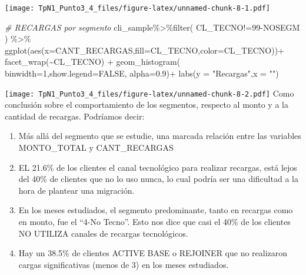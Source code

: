 \documentclass[
]{article}
\newenvironment{Shaded}{\begin{snugshade}}{\end{snugshade}}
\newcommand{\AttributeTok}[1]{\textcolor[rgb]{0.77,0.63,0.00}{#1}}
\newcommand{\CommentTok}[1]{\textcolor[rgb]{0.56,0.35,0.01}{\textit{#1}}}
\newcommand{\ConstantTok}[1]{\textcolor[rgb]{0.00,0.00,0.00}{#1}}
\newcommand{\DecValTok}[1]{\textcolor[rgb]{0.00,0.00,0.81}{#1}}
\newcommand{\FloatTok}[1]{\textcolor[rgb]{0.00,0.00,0.81}{#1}}
\newcommand{\FunctionTok}[1]{\textcolor[rgb]{0.00,0.00,0.00}{#1}}
\newcommand{\NormalTok}[1]{#1}
\newcommand{\SpecialCharTok}[1]{\textcolor[rgb]{0.00,0.00,0.00}{#1}}
\newcommand{\StringTok}[1]{\textcolor[rgb]{0.31,0.60,0.02}{#1}}
\begin{document}
\texttt{[image: TpN1\_Punto3\_4\_files/figure-latex/unnamed-chunk-8-1.pdf]}

\begin{Shaded}
\begin{Highlighting}[]
\CommentTok{\# RECARGAS por segmento}
\NormalTok{cli\_sample}\SpecialCharTok{\%\textgreater{}\%}\FunctionTok{filter}\NormalTok{( CL\_TECNO}\SpecialCharTok{!=}\StringTok{\textquotesingle{}99{-}NOSEGM\textquotesingle{}}\NormalTok{ ) }\SpecialCharTok{\%\textgreater{}\%} 
  \FunctionTok{ggplot}\NormalTok{(}\FunctionTok{aes}\NormalTok{(}\AttributeTok{x=}\NormalTok{CANT\_RECARGAS,}\AttributeTok{fill=}\NormalTok{CL\_TECNO,}\AttributeTok{color=}\NormalTok{CL\_TECNO))}\SpecialCharTok{+}
  \FunctionTok{facet\_wrap}\NormalTok{(}\SpecialCharTok{\textasciitilde{}}\NormalTok{CL\_TECNO) }\SpecialCharTok{+}
  \FunctionTok{geom\_histogram}\NormalTok{( }\AttributeTok{binwidth=}\DecValTok{1}\NormalTok{,}\AttributeTok{show.legend=}\ConstantTok{FALSE}\NormalTok{, }\AttributeTok{alpha=}\FloatTok{0.9}\NormalTok{)}\SpecialCharTok{+}
  \FunctionTok{labs}\NormalTok{(}\AttributeTok{y =} \StringTok{"Recargas"}\NormalTok{,}\AttributeTok{x =} \StringTok{""}\NormalTok{)}
\end{Highlighting}
\end{Shaded}

\texttt{[image: TpN1\_Punto3\_4\_files/figure-latex/unnamed-chunk-8-2.pdf]}
Como conclusión sobre el comportamiento de los segmentos, respecto al
monto y a la cantidad de recargas. Podríamos decir:

\begin{enumerate}
\def\labelenumi{\arabic{enumi}.}
\item
  Más allá del segmento que se estudie, una marcada relación entre las
  variables MONTO\_TOTAL y CANT\_RECARGAS
\item
  EL 21.6\% de los clientes el canal tecnológico para realizar recargas,
  está lejos del 40\% de clientes que no lo uso nunca, lo cual podría
  ser una dificultad a la hora de plantear una migración.
\item
  En los meses estudiados, el segmento predominante, tanto en recargas
  como en monto, fue el ``4-No Tecno''. Esto nos dice que casi el 40\%
  de los clientes NO UTILIZA canales de recargas tecnológicos.
\item
  Hay un 38.5\% de clientes ACTIVE BASE o REJOINER que no realizaron
  cargas significativas (menos de 3) en los meses estudiados.
\end{enumerate}
\end{document}
